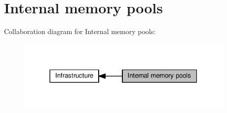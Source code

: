 \hypertarget{group__lwip__opts__memp}{}\section{Internal memory pools}
\label{group__lwip__opts__memp}
Collaboration diagram for Internal memory pools\+:
\nopagebreak
\begin{figure}[H]
\begin{center}
\leavevmode
\includegraphics[width=303pt]{group__lwip__opts__memp}
\end{center}
\end{figure}
